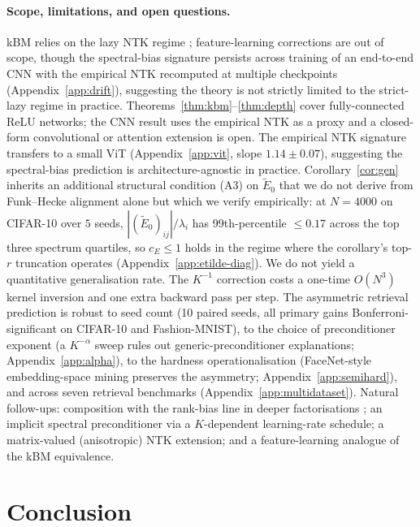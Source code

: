 \documentclass{article}
\newcommand{\E}{E}
\newcommand{\Etilde}{\widetilde{\E}}
\begin{document}
\paragraph{Scope, limitations, and open questions.}
kBM relies on the lazy NTK regime
\citep{chizat2020implicit,jacot2018neural}; feature-learning corrections
\citep{mei2018mean} are out of scope, though the spectral-bias
signature persists across training of an end-to-end CNN with the
empirical NTK recomputed at multiple checkpoints
(Appendix~\ref{app:drift}), suggesting the theory is not strictly
limited to the strict-lazy regime in practice.
Theorems~\ref{thm:kbm}--\ref{thm:depth} cover fully-connected ReLU
networks; the CNN result uses the empirical NTK as a proxy and a
closed-form convolutional or attention extension is open. The
empirical NTK signature transfers to a small ViT
(Appendix~\ref{app:vit}, slope $1.14 \pm 0.07$), suggesting the
spectral-bias prediction is architecture-agnostic in practice.
Corollary~\ref{cor:gen} inherits an additional structural condition
(A3) on $\Etilde_0$ that we do not derive from Funk--Hecke alignment
alone but which we verify empirically: at $N{=}4000$ on CIFAR-10 over
$5$ seeds, $|(\Etilde_0)_{ij}|/\lambda_i$ has 99th-percentile $\leq 0.17$
across the top three spectrum quartiles, so $c_E \leq 1$ holds in the
regime where the corollary's top-$r$ truncation operates
(Appendix~\ref{app:etilde-diag}). We do not yield a quantitative
generalisation rate. The $K^{-1}$ correction costs a one-time
$O(N^3)$ kernel inversion and one extra backward pass per step. The asymmetric retrieval prediction is robust
to seed count (10 paired seeds, all primary gains
Bonferroni-significant on CIFAR-10 and Fashion-MNIST), to the choice
of preconditioner exponent (a $K^{-\alpha}$ sweep rules out
generic-preconditioner explanations; Appendix~\ref{app:alpha}), to the
hardness operationalisation (FaceNet-style embedding-space mining
preserves the asymmetry; Appendix~\ref{app:semihard}), and across
seven retrieval benchmarks
(Appendix~\ref{app:multidataset}). Natural follow-ups:
composition with the rank-bias line in deeper factorisations
\citep{arora2019implicit,razin2020implicit}; an implicit spectral
preconditioner via a $K$-dependent learning-rate schedule; a
matrix-valued (anisotropic) NTK extension; and a feature-learning
analogue of the kBM equivalence.

\section{Conclusion}
\label{sec:conclusion}
\end{document}
